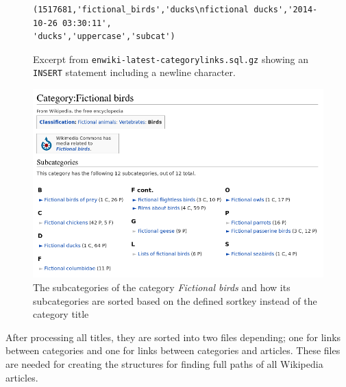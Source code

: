 
\begin{figure}[h]
\begin{lstlisting}
(1517681,'fictional_birds','ducks\nfictional ducks','2014-10-26 03:30:11',
'ducks','uppercase','subcat')
\end{lstlisting}
\caption[\texttt{INSERT} statement with newline]{Excerpt from \texttt{enwiki-latest-categorylinks.sql.gz} showing an \texttt{INSERT} statement including a newline character. }
\label{fig:withnewline}
\end{figure}

\begin{figure}[h]
\centering
\includegraphics[width=\textwidth]{Chapters/Implementation/Fictional_birds_2}
\caption{The subcategories of the category \emph{Fictional birds} and how its subcategories are sorted based on the defined sortkey instead of the category title }
\label{fig:fictionalbirds}
\end{figure}


After processing all titles, they are sorted into two files depending; one for links between categories and one for links between categories and articles. These files are needed for creating the structures for finding full paths of all Wikipedia articles. 


